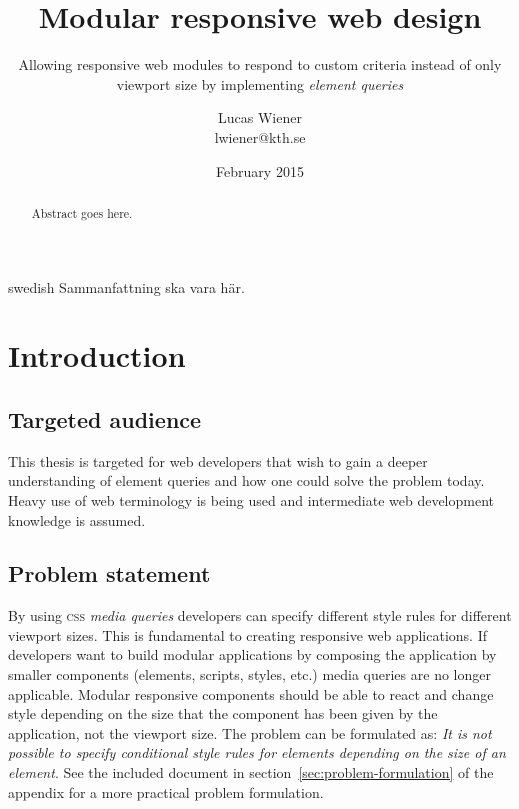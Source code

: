\documentclass[a4paper,11pt]{kth-mag}
\title{Modular responsive web design}
\subtitle{Allowing responsive web modules to respond to custom criteria instead of only viewport size by implementing \emph{element queries}}
\author{Lucas Wiener \\ \lowercase{lwiener@kth.se}}
\date{February 2015}
\begin{document}
  \frontmatter
  \pagestyle{empty}
  \removepagenumbers
  \maketitle
  \begin{abstract}
    Abstract goes here.
  \end{abstract}
  \clearpage
  \begin{foreignabstract}{swedish}
    Sammanfattning ska vara här.
  \end{foreignabstract}
  \clearpage
  \tableofcontents*
  \listoftodos
  \mainmatter
  \pagestyle{newchap}
  \chapter{Introduction}
    \section{Targeted audience}
      This thesis is targeted for web developers that wish to gain a deeper understanding of element queries and how one could solve the problem today.
      Heavy use of web terminology is being used and intermediate web development knowledge is assumed.
    \section{Problem statement}
      By using \textsc{css} \emph{media queries} developers can specify different style rules for different viewport sizes.
      This is fundamental to creating responsive web applications.
      If developers want to build modular applications by composing the application by smaller components (elements, scripts, styles, etc.) media queries are no longer applicable.
      Modular responsive components should be able to react and change style depending on the size that the component has been given by the application, not the viewport size.
      The problem can be formulated as: \emph{It is not possible to specify conditional style rules for elements depending on the size of an element}.
      See the included document in section~\ref{sec:problem-formulation} of the appendix for a more practical problem formulation.
\end{document}
